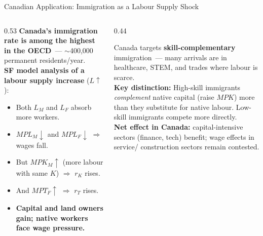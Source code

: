 \documentclass[aspectratio=169]{beamer}
\begin{document}
\begin{frame}{Canadian Application: Immigration as a Labour Supply Shock}
\begin{columns}[T]
\begin{column}{0.53\textwidth}
\textbf{Canada's immigration rate is among the highest
in the OECD}~--- $\sim$400,000 permanent residents/year.\\[0.3em]
\textbf{SF model analysis of a labour supply increase}
($L\uparrow$):
\begin{itemize}\small
  \item Both $L_M$ and $L_F$ absorb more workers.
  \item $MPL_M\downarrow$ and $MPL_F\downarrow$
        $\Rightarrow$ wages fall.
  \item But $MPK_M\uparrow$ (more labour with same $K$)
        $\Rightarrow$ $r_K$ rises.
  \item And $MPT_F\uparrow$ $\Rightarrow$ $r_T$ rises.
  \item \textbf{Capital and land owners gain;
        native workers face wage pressure.}
\end{itemize}
\end{column}
\begin{column}{0.44\textwidth}
\begin{canadex}
\footnotesize Canada targets \textbf{skill-complementary}
immigration~--- many arrivals are in healthcare, STEM,
and trades where labour is scarce.\\[0.2em]
\textbf{Key distinction:}
High-skill immigrants \emph{complement} native capital
(raise $MPK$) more than they substitute for native
labour.  Low-skill immigrants compete more directly.\\[0.2em]
\textbf{Net effect in Canada:} capital-intensive sectors
(finance, tech) benefit; wage effects in service/
construction sectors remain contested.
\end{canadex}
\end{column}
\end{columns}
\end{frame}

\end{document}
